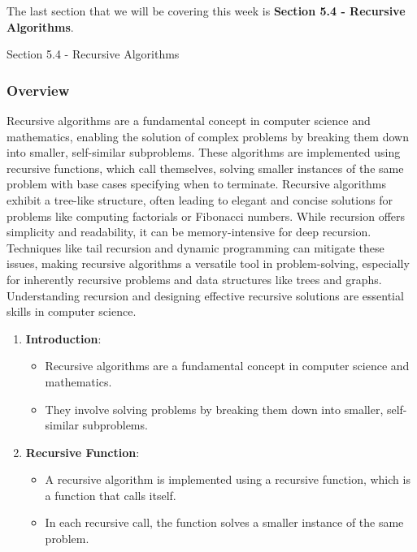 The last section that we will be covering this week is \textbf{Section 5.4 - Recursive Algorithms}.

\begin{notes}{Section 5.4 - Recursive Algorithms}
    \subsubsection*{Overview}

    Recursive algorithms are a fundamental concept in computer science and mathematics, enabling the solution of complex problems by breaking them down into smaller, self-similar subproblems. These 
    algorithms are implemented using recursive functions, which call themselves, solving smaller instances of the same problem with base cases specifying when to terminate. Recursive algorithms exhibit 
    a tree-like structure, often leading to elegant and concise solutions for problems like computing factorials or Fibonacci numbers. While recursion offers simplicity and readability, it can be 
    memory-intensive for deep recursion. Techniques like tail recursion and dynamic programming can mitigate these issues, making recursive algorithms a versatile tool in problem-solving, especially 
    for inherently recursive problems and data structures like trees and graphs. Understanding recursion and designing effective recursive solutions are essential skills in computer science.

    \begin{enumerate}
        \item \textbf{Introduction}:
        \begin{itemize}
            \item Recursive algorithms are a fundamental concept in computer science and mathematics.
            \item They involve solving problems by breaking them down into smaller, self-similar subproblems.
        \end{itemize}
        
        \item \textbf{Recursive Function}:
        \begin{itemize}
            \item A recursive algorithm is implemented using a recursive function, which is a function that calls itself.
            \item In each recursive call, the function solves a smaller instance of the same problem.
        \end{itemize}
        

\end{enumerate}
\end{notes}
